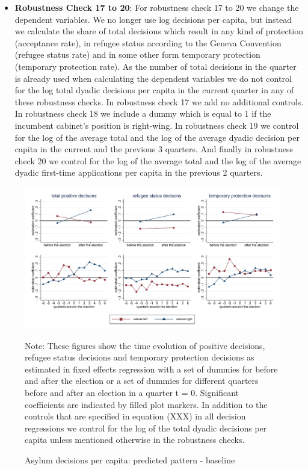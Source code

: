 \documentclass[11pt,a4paper]{scrartcl}
\begin{document}
\begin{itemize}
	\item \textbf{Robustness Check 17 to 20}: For robustness check 17 to 20 we change the dependent variables. We no longer use log decisions per capita, but instead we calculate the share of total decisions which result in any kind of protection (acceptance rate), in refugee status according to the Geneva Convention (refugee status rate) and in some other form temporary protection (temporary protection rate). As the number of total decisions in the quarter is already used when calculating the dependent variables we do not control for the log total dyadic decisions per capita in the current quarter in any of these robustness checks. In robustness check 17 we add no additional controls. In robustness check 18 we include a dummy which is equal to 1 if the incumbent cabinet's position is right-wing. In robustness check 19 we control for the log of the average total and the log of the average dyadic decision per capita in the current and the previous 3 quarters. And finally in robustness check 20 we control for the log of the average total and the log of the average dyadic first-time applications per capita in the previous 2 quarters.
	 
\end{itemize}	
	

\clearpage
\FloatBarrier


\clearpage
\FloatBarrier
\begin{figure}[!ht]
	
	\caption{Asylum decisions per capita: predicted pattern - baseline}
	\centering
	\begin{minipage}{0.9\textwidth} 
		\includegraphics[width=\linewidth]{../results/decisions/dec_graphs_baseline.pdf}
		{\scriptsize Note: These figures show the time evolution of positive decisions, refugee status decisions and temporary protection decisions as estimated in fixed effects regression with a set of dummies for before and after the election or a set of dummies for different quarters before and after an election in a quarter t = 0. Significant coefficients are indicated by filled plot markers. In addition to the controls that are specified in equation (XXX) in all decision regressions we control for the log of the total dyadic decisions per capita unless mentioned otherwise in the robustness checks.\par}
	\end{minipage}
\end{figure}
\end{document}
